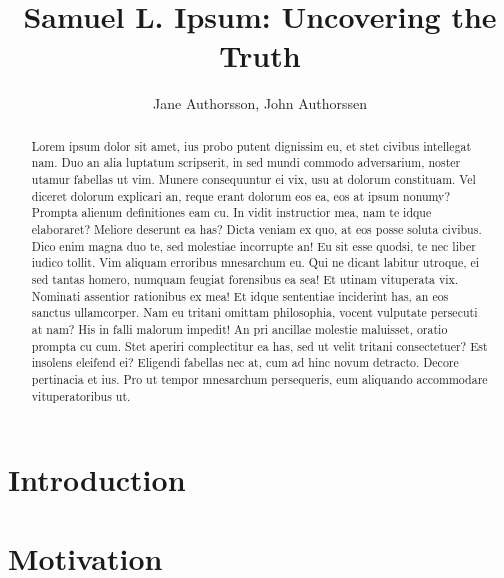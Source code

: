 \documentclass{cs19proc}
\title{Samuel L. Ipsum: Uncovering the Truth}
\author{Jane Authorsson, John Authorssen}
\begin{document}
\maketitle

\begin{abstract}
Lorem ipsum dolor sit amet, ius probo putent dignissim eu, et stet civibus intellegat nam. Duo an alia luptatum scripserit, in sed mundi commodo adversarium, noster utamur fabellas ut vim. Munere consequuntur ei vix, usu at dolorum constituam. Vel diceret dolorum explicari an, reque erant dolorum eos ea, eos at ipsum nonumy? Prompta alienum definitiones eam cu.
 In vidit instructior mea, nam te idque elaboraret? Meliore deserunt ea has? Dicta veniam ex quo, at eos posse soluta civibus. Dico enim magna duo te, sed molestiae incorrupte an! Eu sit esse quodsi, te nec liber iudico tollit. Vim aliquam erroribus mnesarchum eu.
 Qui ne dicant labitur utroque, ei sed tantas homero, numquam feugiat forensibus ea sea! Et utinam vituperata vix. Nominati assentior rationibus ex mea! Et idque sententiae inciderint has, an eos sanctus ullamcorper. Nam eu tritani omittam philosophia, vocent vulputate persecuti at nam? His in falli malorum impedit!
 An pri ancillae molestie maluisset, oratio prompta cu cum. Stet aperiri complectitur ea has, sed ut velit tritani consectetuer? Est insolens eleifend ei? Eligendi fabellas nec at, cum ad hinc novum detracto. Decore pertinacia et ius. Pro ut tempor mnesarchum persequeris, eum aliquando accommodare vituperatoribus ut.
\end{abstract}

\section{Introduction}
\kant

\section{Motivation}
\kant
\end{document}
